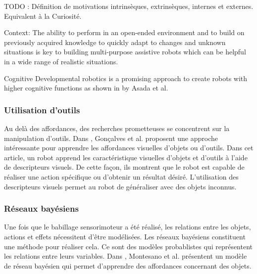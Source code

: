 \documentclass{llncs}
\begin{document}
TODO : Définition de motivations intrinsèques, extrinsèques, internes et externes. Equivalent à la Curiosité.



Context: The ability to perform in an open-ended environment and to build on previously acquired knowledge to quickly adapt to changes and unknown situations is key to building
multi-purpose assistive robots which can be helpful in a wide range of realistic situations.

Cognitive Developmental robotics is a promising approach to create robots with higher cognitive functions as shown in \cite{Asada2009} by Asada et al.





\subsubsection{Utilisation d'outils}
Au delà des affordances, des recherches prometteuses se concentrent sur la manipulation d'outils. Dans \cite{Goncalves2014}, Gonçalves et al. proposent une approche intéressante pour apprendre les affordances visuelles d'objets ou d'outils. Dans cet article, un robot apprend les caractéristique visuelles d'objets et d'outils à l'aide de descripteurs visuels. De cette façon, ils montrent que le robot est capable de réaliser une action spécifique ou d'obtenir un résultat désiré. L'utilisation des descripteurs visuels permet au robot de généraliser avec des objets inconnus.


\subsubsection{Réseaux bayésiens}
Une fois que le babillage sensorimoteur a été réalisé, les relations entre les objets, actions et effets nécessitent d'être modélisées. Les réseaux bayésiens constituent une méthode pour réaliser cela. Ce sont des modèles probablistes qui représentent les relations entre leurs variables. Dans \cite{4456755}, Montesano et al. présentent un modèle de réseau bayésien qui permet d'apprendre des affordances concernant des objets.
\end{document}
